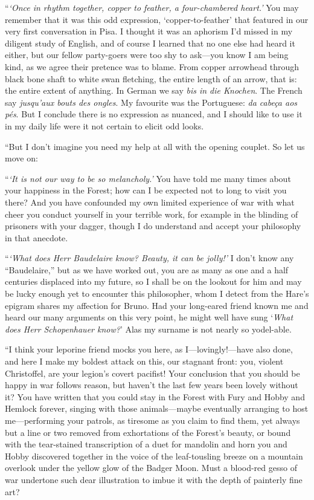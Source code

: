 \documentclass[11pt,a5paper]{article}
\begin{document}
``\emph{`Once in rhythm together, copper to feather, a four-chambered heart.'} You may remember that it was this odd expression, `copper-to-feather' that featured in our very first conversation in Pisa. I thought it was an aphorism I'd missed in my diligent study of English, and of course I learned that no one else had heard it either, but our fellow party-goers were too shy to ask---you know I am being kind, as we agree their pretence was to blame. From copper arrowhead through black bone shaft to white swan fletching, the entire length of an arrow, that is: the entire extent of anything. In German we say \emph{bis in die Knochen}. The French say \emph{jusqu'aux bouts des ongles}. My favourite was the Portuguese: \emph{da cabeça aos pés}. But I conclude there is no expression as nuanced, and I should like to use it in my daily life were it not certain to elicit odd looks.

``But I don't imagine you need my help at all with the opening couplet. So let us move on:

``\emph{`It is not our way to be so melancholy.'} You have told me many times about your happiness in the Forest; how can I be expected not to long to visit you there? And you have confounded my own limited experience of war with what cheer you conduct yourself in your terrible work, for example in the blinding of prisoners with your dagger, though I do understand and accept your philosophy in that anecdote.

``\emph{`What does Herr Baudelaire know? Beauty, it can be jolly!'} I don't know any ``Baudelaire,'' but as we have worked out, you are as many as one and a half centuries displaced into my future, so I shall be on the lookout for him and may be lucky enough yet to encounter this philosopher, whom I detect from the Hare's epigram shares my affection for Bruno. Had your long-eared friend known me and heard our many arguments on this very point, he might well have sung `\emph{What does Herr Schopenhauer know?}' Alas my surname is not nearly so yodel-able.

``I think your leporine friend mocks you here, as I---lovingly!---have also done, and here I make my boldest attack on this, our stagnant front: you, violent Christoffel, are your legion's covert pacifist! Your conclusion that you should be happy in war follows reason, but haven't the last few years been lovely without it? You have written that you could stay in the Forest with Fury and Hobby and Hemlock forever, singing with those animals---maybe eventually arranging to host me---performing your patrols, as tiresome as you claim to find them, yet always but a line or two removed from exhortations of the Forest's beauty, or bound with the tear-stained transcription of a duet for mandolin and horn you and Hobby discovered together in the voice of the leaf-tousling breeze on a mountain overlook under the yellow glow of the Badger Moon. Must a blood-red gesso of war undertone such dear illustration to imbue it with the depth of painterly fine art?
\end{document}
